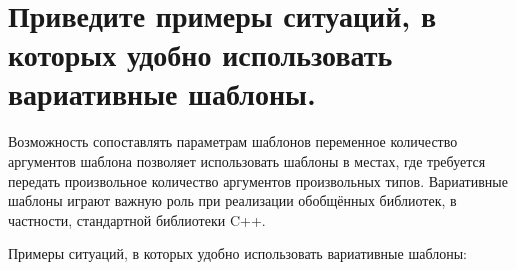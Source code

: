 \documentclass[a4paper,12pt]{article}	%
\title{
	\center{\textbf{Контрольные вопросы}}
	}
\begin{document}

\maketitle

\section{Приведите примеры ситуаций, в которых удобно использовать вариативные шаблоны.}
	
	Возможность сопоставлять параметрам шаблонов переменное количество аргументов шаблона позволяет использовать шаблоны в местах, где требуется передать произвольное количество аргументов произвольных типов. Вариативные шаблоны играют важную роль при реализации обобщённых библиотек, в частности, стандартной библиотеки C++.
	
	Примеры ситуаций, в которых удобно использовать вариативные шаблоны:
	
\end{document}
